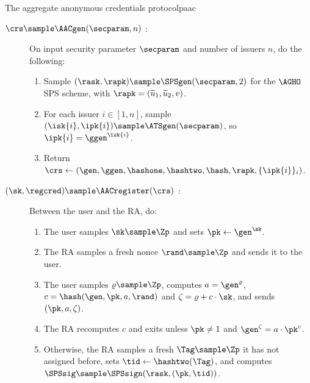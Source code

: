 
\begin{protocolbox}{The aggregate anonymous credentials protocol}{paac}

  \begin{description}

    \item[$\crs \sample \AACgen(\secparam, n)$ :] On input security parameter
$\secparam$ and number of issuers $n$, do the following:

      \begin{enumerate}

	\item Sample $(\rask,\rapk) \sample \SPSgen(\secparam,2)$ for the
$\AGHO$ SPS scheme, with $\rapk = (\widetilde{u}_1, \widetilde{u}_2, v)$.

	\item For each issuer $i \in [1,n]$, sample $(\isk{i},\ipk{i}) \sample
\ATSgen(\secparam)$, so $\ipk{i} = \ggen^{\isk{i}}$.

	\item Return $\crs \leftarrow
(\gen,\ggen,\hashone,\hashtwo,\hash,\rapk,\{\ipk{i}\}_i)$.

      \end{enumerate}

    \item[$(\sk,\regcred) \sample \AACregister(\crs)$ :] Between the user and
the RA, do:

      \begin{enumerate}

	\item The user samples $\sk \sample \Zp$ and sets $\pk \leftarrow
\gen^\sk$.

	\item The RA samples a fresh nonce $\rand \sample \Zp$ and sends it to
the user.

	\item The user samples $\varrho \sample \Zp$, computes $a = \gen^\varrho$,
$c = \hash(\gen, \pk, a, \rand)$ and $\zeta = \varrho + c \cdot \sk$, and sends
$(\pk, a, \zeta)$.

	\item The RA recomputes $c$ and exits unless $\pk \neq 1$ and $\gen^\zeta
= a \cdot \pk^c$.

	\item Otherwise, the RA samples a fresh $\Tag \sample \Zp$ it has not
assigned before, sets $\tid \leftarrow \hashtwo(\Tag)$, and computes $\SPSsig
\sample \SPSsign(\rask,(\pk,\tid))$.


\end{enumerate}
\end{description}
\end{protocolbox}
